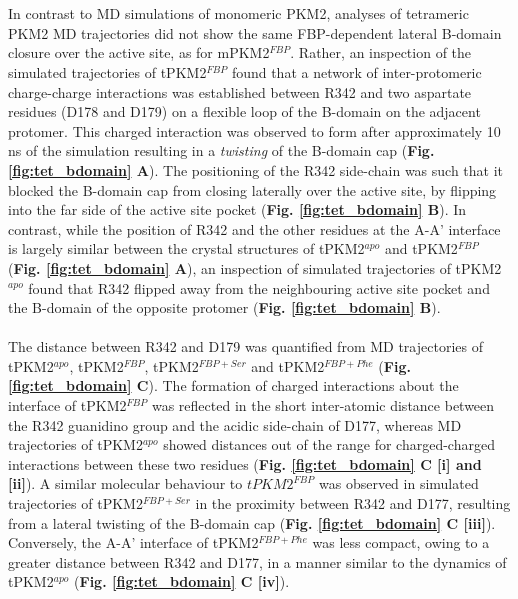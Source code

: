%
%
\\\\
%
%
In contrast to MD simulations of monomeric PKM2, analyses of tetrameric PKM2 MD trajectories did not show the same FBP-dependent lateral B-domain closure over the active site, as for mPKM2$^{FBP}$. Rather, an inspection of the simulated trajectories of tPKM2$^{FBP}$ found that a network of inter-protomeric charge-charge interactions was established between R342 and two aspartate residues (D178 and D179) on a flexible loop of the B-domain on the adjacent protomer. This charged interaction was observed to form after approximately 10 ns of the simulation resulting in a \textit{twisting} of the B-domain cap (\textbf{Fig. \ref{fig:tet_bdomain} A}). The positioning of the R342 side-chain was such that it blocked the B-domain cap from closing laterally over the active site, by flipping into the far side of the active site pocket (\textbf{Fig. \ref{fig:tet_bdomain} B}). In contrast, while the position of R342 and the other residues at the A-A' interface is largely similar between the crystal structures of tPKM2$^{apo}$ and tPKM2$^{FBP}$ (\textbf{Fig. \ref{fig:tet_bdomain} A}), an inspection of simulated trajectories of tPKM2$^{apo}$ found that R342 flipped away from the neighbouring active site pocket and the B-domain of the opposite protomer (\textbf{Fig. \ref{fig:tet_bdomain} B}). 
%
%
\\\\
%
%
The distance between R342 and D179 was quantified from MD trajectories of tPKM2$^{apo}$, tPKM2$^{FBP}$, tPKM2$^{FBP+Ser}$ and tPKM2$^{FBP+Phe}$ (\textbf{Fig. \ref{fig:tet_bdomain} C}). The formation of charged interactions about the interface of tPKM2$^{FBP}$ was reflected in the short inter-atomic distance between the R342 guanidino group and the acidic side-chain of D177, whereas MD trajectories of tPKM2$^{apo}$ showed distances out of the range for charged-charged interactions between these two residues (\textbf{Fig. \ref{fig:tet_bdomain} C [i] and [ii]}). A similar molecular behaviour to $tPKM2^{FBP}$ was observed in simulated trajectories of tPKM2$^{FBP+Ser}$ in the proximity between R342 and D177, resulting from a lateral twisting of the B-domain cap (\textbf{Fig. \ref{fig:tet_bdomain} C [iii]}). Conversely, the A-A' interface of tPKM2$^{FBP+Phe}$ was less compact, owing to a greater distance between R342 and D177, in a manner similar to the dynamics of tPKM2$^{apo}$ (\textbf{Fig. \ref{fig:tet_bdomain} C [iv]}).
%
%
\\\\
